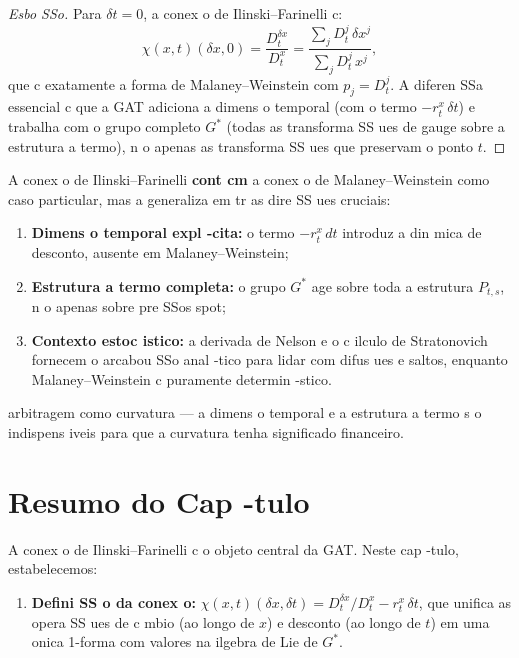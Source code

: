 {\begin{proof}[Esbo SSo]
Para $\delta t = 0$, a conex o de Ilinski--Farinelli c:
\[
\chi(x,t)(\delta x, 0) = \frac{D_t^{\delta x}}{D_t^x}
= \frac{\sum_j D_t^j\,\delta x^j}{\sum_j D_t^j\,x^j},
\]
que c exatamente a forma de Malaney--Weinstein com $p_j = D_t^j$. A
diferen SSa essencial c que a GAT adiciona a dimens o temporal (com o
termo $-r_t^x\,\delta t$) e trabalha com o grupo completo $G^*$ (todas
as transforma SS ues de gauge sobre a estrutura a termo), n o apenas as
transforma SS ues que preservam o ponto $t$.
\end{proof}

\begin{obs}
A conex o de Ilinski--Farinelli \textbf{cont cm} a conex o de
Malaney--Weinstein como caso particular, mas a generaliza em tr as
dire SS ues cruciais:
\begin{enumerate}
 \item \textbf{Dimens o temporal expl -cita:} o termo $-r_t^x\,dt$
 introduz a din mica de desconto, ausente em Malaney--Weinstein;
 \item \textbf{Estrutura a termo completa:} o grupo $G^*$ age sobre
 toda a estrutura $P_{t,s}$, n o apenas sobre pre SSos spot;
 \item \textbf{Contexto estoc istico:} a derivada de Nelson e o c ilculo
 de Stratonovich fornecem o arcabou SSo anal -tico para lidar com
 difus ues e saltos, enquanto Malaney--Weinstein c puramente
 determin -stico.
\end{enumerate}
arbitragem como curvatura --- a dimens o temporal e a estrutura a termo
s o indispens iveis para que a curvatura tenha significado financeiro.
\end{obs}

\section{Resumo do Cap -tulo}

A conex o de Ilinski--Farinelli c o objeto central da GAT. Neste
cap -tulo, estabelecemos:

\begin{enumerate}
 \item \textbf{Defini SS o da conex o:} $\chi(x,t)(\delta x, \delta t)
 = D_t^{\delta x}/D_t^x - r_t^x\,\delta t$, que unifica as
 opera SS ues de c mbio (ao longo de $x$) e desconto (ao longo de
 $t$) em uma onica 1-forma com valores na ilgebra de Lie de
 $G^*$.


\end{enumerate}}
